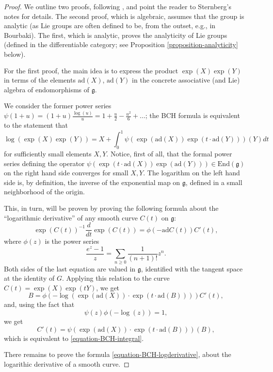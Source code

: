 \begin{proof}
 We outline two proofs, following \cite{Sternberg}, and point the reader to Sternberg's notes for details. The second proof, which is algebraic, assumes that the group is analytic (as Lie groups are often defined to be, from the outset, e.g., in Bourbaki). The first, which is analytic, proves the analyticity of Lie groups (defined in the differentiable category; see Proposition \ref{proposition-analyticity} below).
 
 For the first proof, the main idea is to express the product $\exp(X)\exp(Y)$ in terms of the elements $\text{ad}(X)$, $\text{ad}(Y)$ in the concrete associative (and Lie) algebra of endomorphisms of $\mathfrak g$. 
 
 We consider the former power series $\psi(1+u) = (1+u) \frac{\log(u)}{u} = 1+\frac{u}{2} - \frac{u^2}{6}+ \dots$; the BCH formula is equivalent to the statement that 
\begin{equation}
 \label{equation-BCH-integral}
 \log(\exp(X)\exp(Y)) = X + \int_0^1 \psi(\exp(\text{ad}(X)) \exp(t\cdot \text{ad}(Y))) (Y) dt
\end{equation}
for sufficiently small elements $X, Y$. Notice, first of all, that the formal power series defining the operator $\psi(\exp(t\cdot \text{ad}(X)) \exp(\text{ad}(Y))) \in \text{End}(\mathfrak g)$ on the right hand side converges for small $X, Y$. The logarithm on the left hand side is, by definition, the inverse of the exponential map on $\mathfrak g$, defined in a small neighborhood of the origin. 

This, in turn, will be proven by proving the following formula about the ``logarithmic derivative'' of any smooth curve $C(t)$ on $\mathfrak g$:
\begin{equation}
\label{equation-BCH-logderivative}
 \exp(C(t))^{-1} \frac{d}{dt} \exp(C(t)) = \phi(-\text{ad} C(t)) C'(t),
\end{equation}
where $\phi(z)$ is the power series 
$$\frac{e^z-1}{z} = \sum_{n\ge 0} \frac{1}{(n+1)!} z^n.$$ 
Both sides of the last equation are valued in $\mathfrak g$, identified with the tangent space at the identity of $G$. Applying this relation to the curve $C(t) = \exp(X) \exp(tY)$, we get 
$$ B = \phi(- \log(\exp(\text{ad} (X)) \cdot \exp(t\cdot \text{ad}(B)))) C'(t),$$
and, using the fact that 
$$ \psi(z) \phi(-\log(z)) = 1,$$
we get 
$$ C'(t) = \psi(\exp(\text{ad} (X)) \cdot \exp(t\cdot \text{ad}(B))) (B), $$
which is equivalent to \eqref{equation-BCH-integral}. 

There remains to prove the formula \eqref{equation-BCH-logderivative}, about the logarithic derivative of a smooth curve. 


\end{proof}
